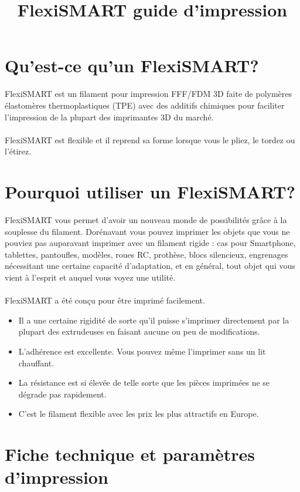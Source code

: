 \documentclass[11pt,a4paper]{article}
\title{FlexiSMART guide d’impression}
\date{}
\begin{document}

\section{Qu’est-ce qu’un FlexiSMART?}FlexiSMART est un filament pour impression FFF/FDM 3D faite de polymères élastomères thermoplastiques (TPE) avec des additifs chimiques pour faciliter l'impression de la plupart des imprimantes 3D du marché.
\\\\
FlexiSMART est flexible et il reprend sa forme lorsque vous le pliez, le tordez ou l’étirez.
\section{Pourquoi utiliser un FlexiSMART?}FlexiSMART vous permet d’avoir un nouveau monde de possibilités grâce à la souplesse du filament. Dorénavant vous pouvez imprimer les objets que vous ne pouviez pas auparavant imprimer avec un filament rigide : cas pour Smartphone, tablettes, pantoufles, modèles, roues RC, prothèse, blocs silencieux, engrenages nécessitant une certaine capacité d’adaptation, et en général, tout objet qui vous vient à l’esprit et auquel vous voyez une utilité.
\\\\
FlexiSMART a été conçu pour être imprimé facilement.
\begin{itemize}
\item Il a une certaine rigidité de sorte qu'il puisse s’imprimer directement par la plupart des extrudeuses en faisant aucune ou peu de modifications.
\item L’adhérence est excellente. Vous pouvez même l’imprimer sans un lit chauffant.
\item La résistance est si élevée de telle sorte que les pièces imprimées ne se dégrade pas rapidement.
\item C’est le filament flexible avec les prix les plus attractifs en Europe.
\end{itemize}

\section{Fiche technique et paramètres d’impression}
\end{document}
